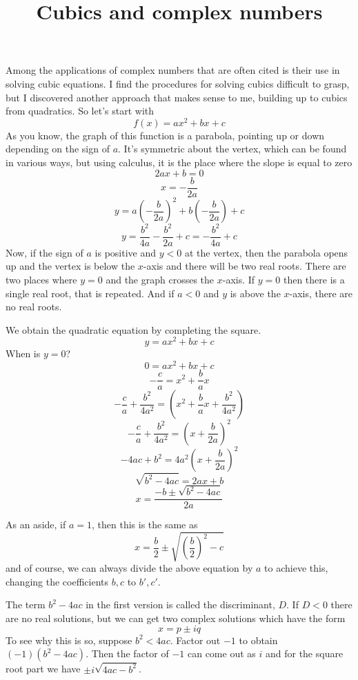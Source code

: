 \documentclass[11pt, oneside]{article}   	%
\title{Cubics and complex numbers}
\date{}							%
\begin{document}
\maketitle
\Large
\noindent
Among the applications of complex numbers that are often cited is their use in solving cubic equations.  I find the procedures for solving cubics difficult to grasp, but I discovered another approach that makes sense to me, building up to cubics from quadratics.  So let's start with
\[ f(x) = ax^2 + bx + c \]
As you know, the graph of this function is a parabola, pointing up or down depending on the sign of $a$.  It's symmetric about the vertex, which can be found in various ways, but using calculus, it is the place where the slope is equal to zero
\[ 2ax + b = 0 \]
\[ x = - \frac{b}{2a} \]
\[ y = a(- \frac{b}{2a})^2 + b(- \frac{b}{2a}) + c \]
\[ y = \frac{b^2}{4a} - \frac{b^2}{2a} + c = - \frac{b^2}{4a} + c\]
Now, if the sign of $a$ is positive and $y < 0$ at the vertex, then the parabola opens up and the vertex is below the $x$-axis and there will be two real roots.  There are two places where $y=0$ and the graph crosses the $x$-axis.  If $y=0$ then there is a single real root, that is repeated.  And if $a < 0$ and $y$ is above the $x$-axis, there are no real roots.

We obtain the quadratic equation by completing the square.
\[ y = ax^2 + bx + c \]
When is $y=0$?
\[ 0 = ax^2 + bx + c \]
\[ -\frac{c}{a} = x^2 + \frac{b}{a}x  \]
\[ -\frac{c}{a} + \frac{b^2}{4a^2} = (x^2 + \frac{b}{a}x + \frac{b^2}{4a^2}) \]
\[ -\frac{c}{a} + \frac{b^2}{4a^2} = (x + \frac{b}{2a})^2 \]
\[ -4ac + b^2 = 4a^2(x + \frac{b}{2a})^2 \]
\[ \sqrt{b^2 - 4ac} = 2ax + b \]
\[ x = \frac{-b \pm \sqrt{b^2 - 4ac}}{2a} \]

As an aside, if $a=1$, then this is the same as
\[ x = \frac{b}{2} \pm \sqrt{(\frac{b}{2})^2 - c} \]
and of course, we can always divide the above equation by $a$ to achieve this, changing the coefficients $b,c$ to $b',c'$.

The term $b^2-4ac$ in the first version is called the discriminant, $D$.  If $D<0$ there are no real solutions, but we can get two complex solutions which have the form
\[ x = p \pm i q \]
To see why this is so, suppose $b^2 < 4ac$.  Factor out $-1$ to obtain $(-1)(b^2 - 4ac)$.  Then the factor of $-1$ can come out as $i$ and for the square root part we have $\pm i \sqrt{4ac - b^2}$.
\end{document}
